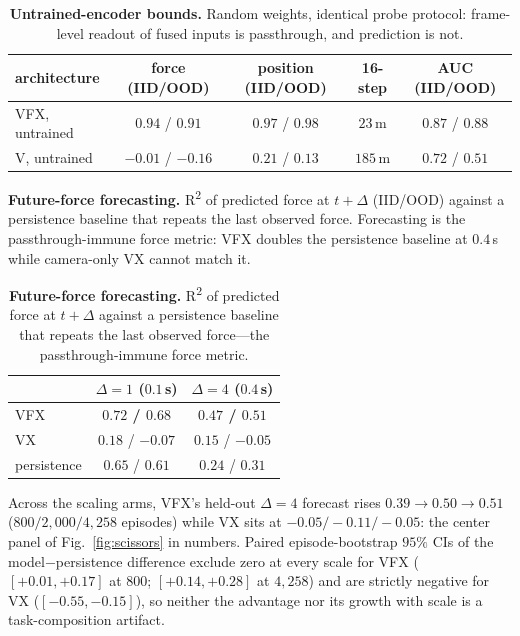 \documentclass{article} %
\newcommand{\best}[1]{\textbf{#1}}
\begin{document}
\begin{table}[H]
\caption{\textbf{Untrained-encoder bounds.} Random weights, identical probe protocol: frame-level readout of fused inputs is passthrough, and prediction is not.}
\label{tab:rand}
\begin{center}
\small
\begin{tabular}{lcccc}
\toprule
\rowcolor{tabhead} architecture & force (IID/OOD) & position (IID/OOD) & 16-step & AUC (IID/OOD) \\
\midrule
VFX, untrained & $0.94$ / $0.91$ & $0.97$ / $0.98$ & $23$\,m & $0.87$ / $0.88$ \\
V, untrained & $-0.01$ / $-0.16$ & $0.21$ / $0.13$ & $185$\,m & $0.72$ / $0.51$ \\
\bottomrule
\end{tabular}
\end{center}
\end{table}

\textbf{Future-force forecasting.} R\textsuperscript{2} of predicted force
at $t{+}\Delta$ (IID/OOD) against a persistence baseline that repeats the
last observed force. Forecasting is the passthrough-immune force metric:
VFX doubles the persistence baseline at $0.4$\,s while camera-only VX
cannot match it.

\begin{table}[H]
\caption{\textbf{Future-force forecasting.} R\textsuperscript{2} of predicted force at $t{+}\Delta$ against a persistence baseline that repeats the last observed force---the passthrough-immune force metric.}
\label{tab:futforce}
\begin{center}
\small
\begin{tabular}{lcc}
\toprule
\rowcolor{tabhead} & $\Delta{=}1$ ($0.1$\,s) & $\Delta{=}4$ ($0.4$\,s) \\
\midrule
\rowcolor{tabours} VFX & \best{$0.72$ / $0.68$} & \best{$0.47$ / $0.51$} \\
VX & $0.18$ / $-0.07$ & $0.15$ / $-0.05$ \\
persistence & $0.65$ / $0.61$ & $0.24$ / $0.31$ \\
\bottomrule
\end{tabular}
\end{center}
\end{table}

Across the scaling arms, VFX's held-out $\Delta{=}4$ forecast rises
$0.39 \rightarrow 0.50 \rightarrow 0.51$ ($800/2{,}000/4{,}258$ episodes)
while VX sits at $-0.05/-0.11/-0.05$: the center panel of
Fig.~\ref{fig:scissors} in numbers. Paired episode-bootstrap $95\%$ CIs of
the model$-$persistence difference exclude zero at every scale for VFX
($[+0.01, +0.17]$ at $800$; $[+0.14, +0.28]$ at $4{,}258$) and are strictly
negative for VX ($[-0.55, -0.15]$), so neither the advantage nor its growth
with scale is a task-composition artifact.
\end{document}
